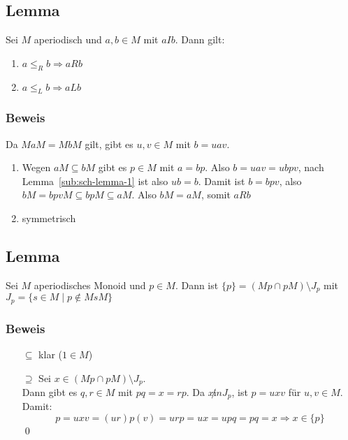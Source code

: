     \subsection{Lemma}
        \label{sub:sch-lemma-2}
        Sei $M$ aperiodisch und $a,b\in M$ mit $aIb$. Dann gilt:
        \begin{enumerate}
            \item $a\le_R b\Rightarrow aRb$
            \item $a\le_L b\Rightarrow aLb$
        \end{enumerate}
        \subsubsection{Beweis}
            Da $MaM=MbM$ gilt, gibt es $u,v\in M$ mit $b=uav$.
            \begin{enumerate}
                \item Wegen $aM\subseteq bM$ gibt es $p\in M$ mit $a=bp$. Also $b=uav=ubpv$, nach Lemma~\ref{sub:sch-lemma-1} ist also $ub=b$.
                Damit ist $b=bpv$, also $bM=bpvM\subseteq bpM\subseteq aM$. Also $bM=aM$, somit $aRb$
                \item symmetrisch
            \end{enumerate}
    \subsection{Lemma}
        \label{sub:sch-lemma-3}
        Sei $M$ aperiodisches Monoid und $p\in M$. Dann ist $\{p\}=(Mp\cap pM)\setminus J_p$ mit $J_p=\{s\in M\mid p\not\in MsM\}$
        \subsubsection{Beweis}
            \begin{itemize}
                \item[$\subseteq$] klar ($1\in M$)
                \item[$\supseteq$] Sei $x\in (Mp\cap pM)\setminus J_p$.\\
                Dann gibt es $q,r\in M$ mit $pq=x=rp$. Da $x\not in J_p$, ist $p=uxv$ für $u,v\in M$.\\
                Damit: $$p=uxv=(ur)p(v)=urp=ux=upq=pq=x\Rightarrow x\in\{p\}$$\qed
            \end{itemize}
